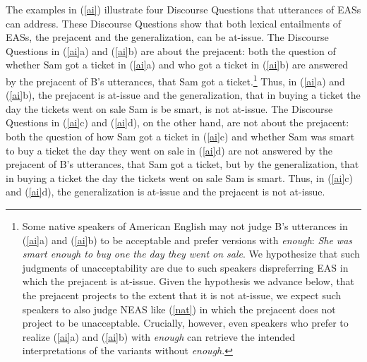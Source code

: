 \documentclass[11pt,fleqn]{article}
\newcommand{\6}{\mbox{$[\hspace*{-.6mm}[$}}
\newcommand{\9}{\mbox{$]\hspace*{-.6mm}]$}}
\begin{document}
The examples in (\ref{ai}) illustrate four Discourse Questions that utterances of EASs can address. These Discourse Questions show that both lexical entailments of EASs, the prejacent and the generalization, can be at-issue. The Discourse Questions in (\ref{ai}a) and (\ref{ai}b) are about the prejacent: both the question of whether Sam got a ticket in (\ref{ai}a) and who got a ticket in (\ref{ai}b) are answered by the prejacent of B's utterances, that Sam got a ticket.\footnote{Some native speakers of American English may not judge B's utterances in (\ref{ai}a) and (\ref{ai}b) to be acceptable and prefer versions with {\em enough}: {\em She was smart enough to buy one the day they went on sale}. We hypothesize that such judgments of unacceptability are due to such speakers dispreferring EAS in which the prejacent is at-issue. Given the hypothesis we advance below, that the prejacent projects to the extent that it is not at-issue, we expect such speakers to also judge NEAS like (\ref{nat}) in which the prejacent does not project to be unacceptable. Crucially, however, even speakers who prefer to realize (\ref{ai}a) and (\ref{ai}b) with {\em enough} can retrieve the intended interpretations of the variants without {\em enough}.} Thus, in (\ref{ai}a) and (\ref{ai}b), the prejacent is at-issue and the generalization, that in buying a ticket the day the tickets went on sale Sam is be smart, is not at-issue. The Discourse Questions in (\ref{ai}c) and (\ref{ai}d), on the other hand, are not about the prejacent:  both the question of how Sam got a ticket in (\ref{ai}c) and whether Sam was smart to buy a ticket the day they went on sale in (\ref{ai}d) are not answered by the prejacent of B's utterances, that Sam got a ticket, but by the generalization, that in buying a ticket the day the tickets went on sale Sam is smart. Thus, in (\ref{ai}c) and (\ref{ai}d), the generalization is at-issue and the prejacent is not at-issue.
\end{document}
